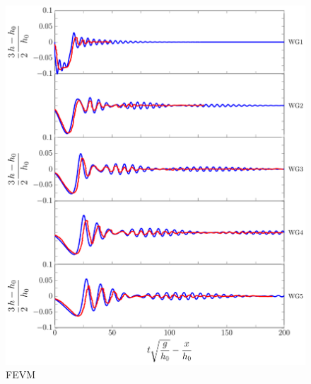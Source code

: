 \begin{figure}
	\centering
	\includegraphics[width=\textwidth]{./chp6/figures/Experiment/Segur/LongWGsFEVM1cm.pdf}
	\caption{FEVM}
	\label{fig:Segur1cmFEVM}
\end{figure}
